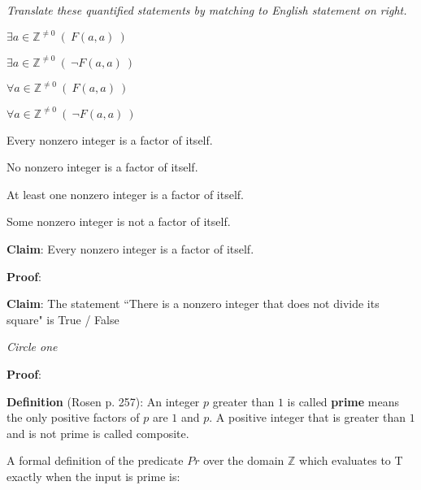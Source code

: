 \documentclass[12pt, oneside]{article}
\begin{document}
\newpage
{\it Translate these quantified statements by matching to English statement on right.}

\begin{multicols}{2}
$\exists a\in \mathbb{Z}^{\neq 0} ~(~F(a,a)~)$

$\exists a\in \mathbb{Z}^{\neq 0} ~(~\lnot F(a,a)~)$

$\forall a\in \mathbb{Z}^{\neq 0} ~(~F(a,a)~)$

$\forall a\in \mathbb{Z}^{\neq 0} ~(~\lnot F(a,a)~)$


Every nonzero integer is a factor of itself.

No nonzero integer is a factor of itself.

At least one nonzero integer is a factor of itself.

Some nonzero integer is not a factor of itself.
\end{multicols}


{\bf Claim}: Every nonzero integer is a factor of itself.

{\bf Proof}: 


\vfill


{\bf Claim}: The statement ``There is a nonzero integer that does not divide its square" is True / False 

\vspace{-15pt}

\hfill{\it Circle one}

\vspace{-15pt}

{\bf Proof}: 


\vfill



\newpage

{\bf Definition} (Rosen p. 257):  An integer $p$ greater than $1$ is called {\bf prime} means 
the only positive factors of 
$p$ are $1$ and $p$.  A positive integer that is greater than $1$ and is not prime is called composite. 

A formal definition of the predicate $Pr$ over the domain $\mathbb{Z}$ which evaluates to T exactly when the input is prime is:
\phantom{$(x > 1) \land \forall a( ~ (~ a > 0 \land F(a,x) ~) \to (a = 1 \lor a = x) ~)$}
\end{document}
